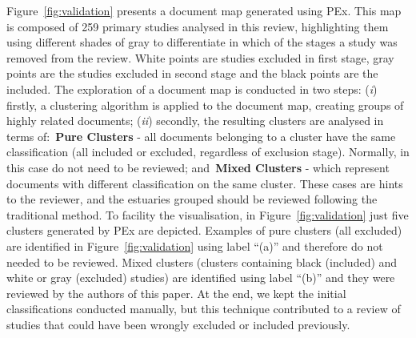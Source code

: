 Figure~\ref{fig:validation} presents a document map generated using PEx. This map is composed of 259 primary studies analysed in this review, highlighting them using different shades of gray to differentiate in which of the stages a study was removed from the review. White points are studies excluded in first stage, gray points are the studies excluded in second stage and the black points are the included. The exploration of a document map is conducted in two steps: (\textit{i}) firstly, a clustering algorithm is applied to the document map, creating groups of highly related documents; (\textit{ii}) secondly, the resulting clusters are analysed in terms of:~\textbf{Pure Clusters} - all documents belonging to a cluster have the same classification (all included or excluded, regardless of exclusion stage). Normally, in this case do not need to be reviewed; and~\textbf{Mixed Clusters} - which represent documents with different classification on the same cluster. These cases are hints to the reviewer, and the estuaries grouped should be reviewed following the traditional method. To facility the visualisation, in Figure~\ref{fig:validation} just five clusters generated by PEx are depicted. Examples of pure clusters (all excluded) are identified in Figure~\ref{fig:validation} using label ``(a)'' and therefore do not needed to be reviewed. Mixed clusters (clusters containing black (included) and white or gray (excluded) studies) are identified using label ``(b)'' and they were reviewed by the authors of this paper. At the end, we kept the initial classifications conducted manually, but this technique contributed to a review of studies that could have been wrongly excluded or included previously.  

